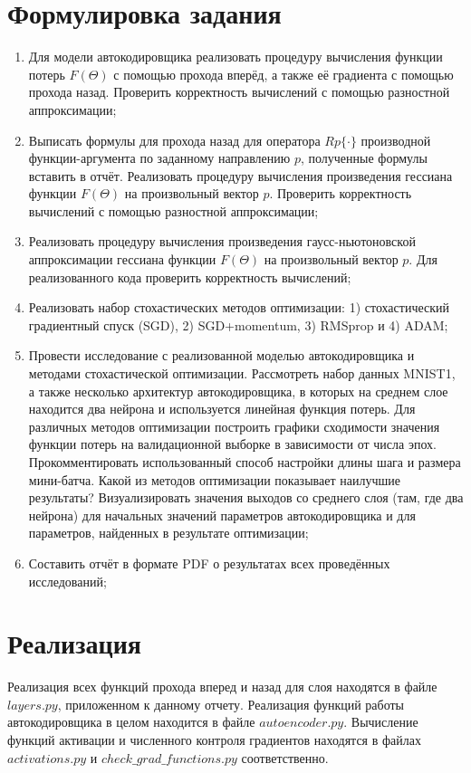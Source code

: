 \documentclass[oneside,final,12pt]{extreport}
\begin{document}
\section*{Формулировка задания}
\begin{enumerate}
\item Для модели автокодировщика реализовать процедуру вычисления функции потерь $F(\Theta)$ с помощью прохода вперёд, а также её градиента с помощью прохода назад. Проверить корректность вычислений с помощью разностной аппроксимации;
\item Выписать формулы для прохода назад для оператора $Rp\{·\}$ производной функции-аргумента по заданному направлению $p$, полученные формулы вставить в отчёт. Реализовать процедуру вычисления произведения гессиана функции $F(\Theta)$ на произвольный вектор $p$. Проверить корректность вычислений с помощью разностной аппроксимации;
\item Реализовать процедуру вычисления произведения гаусс-ньютоновской аппроксимации гессиана функции $F(\Theta)$ на произвольный вектор $p$. Для реализованного кода проверить корректность вычислений;
\item Реализовать набор стохастических методов оптимизации: 1) стохастический градиентный спуск (SGD), 2) SGD+momentum, 3) RMSprop и 4) ADAM;
\item Провести исследование с реализованной моделью автокодировщика и методами стохастической оптимизации. Рассмотреть набор данных MNIST1, а также несколько архитектур автокодировщика, в которых на среднем слое находится два нейрона и используется линейная функция потерь. Для различных методов оптимизации построить графики сходимости значения функции потерь на валидационной выборке в зависимости от числа эпох. Прокомментировать использованный способ настройки длины шага и размера мини-батча. Какой из методов оптимизации показывает наилучшие результаты? Визуализировать значения выходов со среднего слоя (там, где два нейрона) для начальных значений параметров автокодировщика и для параметров, найденных в результате оптимизации;
\item Составить отчёт в формате PDF о результатах всех проведённых исследований;
\end{enumerate}
\newpage
\section*{Реализация}
Реализация всех функций прохода вперед и назад для слоя находятся в файле $layers.py$, приложенном к данному отчету.  Реализация функций работы автокодировщика в целом находится в файле $autoencoder.py$. Вычисление функций активации и численного контроля градиентов находятся в файлах $activations.py$ и $check\_grad\_functions.py$ соответственно.
\end{document}
